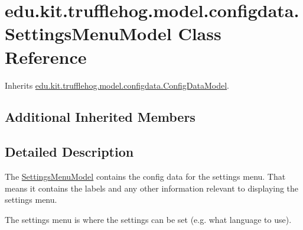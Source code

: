 \hypertarget{classedu_1_1kit_1_1trufflehog_1_1model_1_1configdata_1_1_settings_menu_model}{}\section{edu.\+kit.\+trufflehog.\+model.\+configdata.\+Settings\+Menu\+Model Class Reference}
\label{classedu_1_1kit_1_1trufflehog_1_1model_1_1configdata_1_1_settings_menu_model}


Inherits \hyperlink{classedu_1_1kit_1_1trufflehog_1_1model_1_1configdata_1_1_config_data_model}{edu.\+kit.\+trufflehog.\+model.\+configdata.\+Config\+Data\+Model}.

\subsection*{Additional Inherited Members}


\subsection{Detailed Description}
The \hyperlink{classedu_1_1kit_1_1trufflehog_1_1model_1_1configdata_1_1_settings_menu_model}{Settings\+Menu\+Model} contains the config data for the settings menu. That means it contains the labels and any other information relevant to displaying the settings menu. 

The settings menu is where the settings can be set (e.\+g. what language to use). 